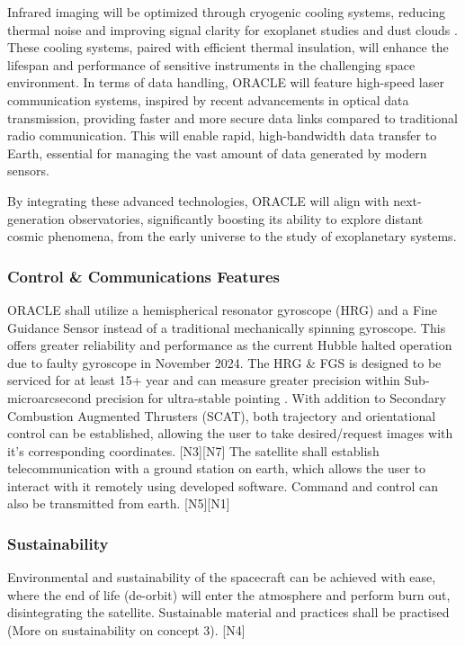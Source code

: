 Infrared imaging will be optimized through cryogenic cooling systems, reducing thermal noise and improving signal clarity for exoplanet studies and dust clouds \cite{gardner2006james}. These cooling systems, paired with efficient thermal insulation, will enhance the lifespan and performance of sensitive instruments in the challenging space environment. In terms of data handling, ORACLE will feature high-speed laser communication systems, inspired by recent advancements in optical data transmission, providing faster and more secure data links compared to traditional radio communication. This will enable rapid, high-bandwidth data transfer to Earth, essential for managing the vast amount of data generated by modern sensors.

\vspace{1.5mm}

By integrating these advanced technologies, ORACLE will align with next-generation observatories, significantly boosting its ability to explore distant cosmic phenomena, from the early universe to the study of exoplanetary systems.


\vspace{1.5mm}

\subsubsection{Control \& Communications Features}
ORACLE shall utilize a hemispherical resonator gyroscope (HRG) and a Fine Guidance Sensor instead of a traditional mechanically spinning gyroscope. This offers greater reliability and performance as the current Hubble halted operation due to faulty gyroscope in November 2024\cite{NASANEWS}. The HRG \& FGS is designed to be serviced for at least 15+ year \cite{NASAJWSTFS} and can measure greater precision within Sub-microarcsecond precision for ultra-stable pointing \cite{NASAJWST}. With addition to Secondary Combustion Augmented Thrusters (SCAT), both trajectory and orientational control can be established, allowing the user to take desired/request images with it's corresponding coordinates. [N3][N7] The satellite shall establish telecommunication with a ground station on earth, which allows the user to interact with it remotely using developed software. Command and control can also be transmitted from earth. [N5][N1]

\subsubsection{Sustainability}
Environmental and sustainability of the spacecraft can be achieved with ease, where the end of life (de-orbit) will enter the atmosphere and perform burn out, disintegrating the satellite. Sustainable material and practices shall be practised (More on sustainability on concept 3). [N4]




